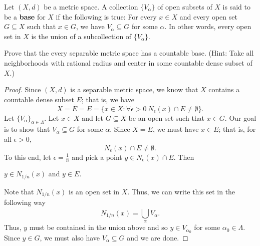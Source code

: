 \documentclass[a4paper]{article}
\begin{document}
   \begin{problem}
       Let \( (X,d) \) be a metric space. A collection \( \{ {V}_{\alpha} \} \) of open subsets of \( X  \) is said to be a \textbf{base} for \( X  \) if the following is true: For every \( x \in X  \) and every open set \( G \subseteq X   \) such that \( x \in G  \), we have \( {V}_{\alpha} \subseteq G   \) for some \( \alpha \). In other words, every open set in \( X  \) is the union of a subcollection of \( \{ {V}_{\alpha} \}  \). 

       Prove that the every separable metric space has a countable base. (Hint: Take all neighborhoods with rational radius and center in some countable dense subset of \( X  \).)
   \end{problem}
   \begin{proof}
   Since \( (X,d) \) is a separable metric space, we know that \( X  \) contains a countable dense subset \( E  \); that is, we have 
   \[  X = \overline{E} = E = \{ x \in X : \forall \epsilon > 0 \ {N}_{\epsilon}(x) \cap E \neq \emptyset \}. \]
   Let \( \{ {V}_{\alpha} \}_{\alpha \in \Lambda} \). Let \( x \in X  \) and let \( G \subseteq  X   \) be an open set such that \( x \in G  \). Our goal is to show that \( {V}_{\alpha} \subseteq  G  \) for some \( \alpha \). Since \( X = \overline{E } \), we must have \( x \in \overline{E} \); that is, for all \( \epsilon > 0  \),
   \[  {N}_{\epsilon}(x) \cap E \neq \emptyset. \]
   To this end, let \( \epsilon = \frac{ 1 }{ n }  \) and pick a point \( y \in {N}_{\epsilon}(x) \cap E  \). Then
   \begin{center}
       \( y \in {N}_{1/n}(x) \) and \( y \in E  \).
   \end{center}
    Note that \( {N}_{1/n}(x) \) is an open set in \( X  \). Thus, we can write this set in the following way
    \[  {N}_{1/n}(x) = \bigcup_{ \alpha }^{  } {V}_{\alpha}. \]
    Thus, \( y  \) must be contained in the union above and so \( y \in {V}_{\alpha_0} \) for some \( {\alpha}_{0} \in \Lambda \). Since \( y \in G  \), we must also have \( {V}_{\alpha} \subseteq G  \) and we are done.
   \end{proof}
\end{document}
